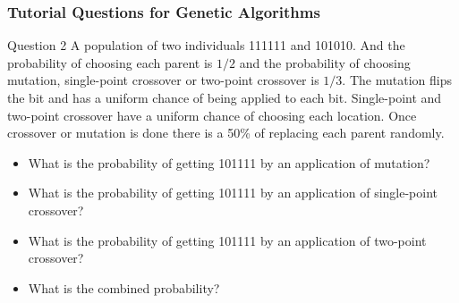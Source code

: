 \documentclass[aspectratio=169, 10pt]{beamer}
\begin{document}
\begin{frame}
    \frametitle{Tutorial Questions for Genetic Algorithms}

    \begin{block}{Question 2}
        A population of two individuals 111111 and 101010. 
        And the probability of choosing each parent is $1/2$ and the probability of choosing mutation, 
        single-point crossover or two-point crossover is $1/3$. 
        The mutation flips the bit and has a uniform chance of being applied to each bit. 
        Single-point and two-point crossover have a uniform chance of choosing each location. 
        Once crossover or mutation is done there is a 50\% of replacing each parent randomly.
    \end{block}

    \begin{itemize}
        \item What is the probability of getting 101111 by an application of mutation?
        \item What is the probability of getting 101111 by an application of single-point crossover?
        \item What is the probability of getting 101111 by an application of two-point crossover?
        \item What is the combined probability?
    \end{itemize}
    
\end{frame}
\end{document}
